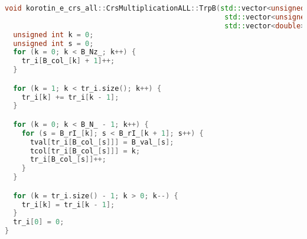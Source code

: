 \documentclass[a4paper,12pt]{article}
\begin{document}
\begin{lstlisting}[language=C++]
void korotin_e_crs_all::CrsMultiplicationALL::TrpB(std::vector<unsigned int> &tr_i,
                                                    std::vector<unsigned int> &tcol,
                                                    std::vector<double> &tval) {
  unsigned int k = 0;
  unsigned int s = 0;
  for (k = 0; k < B_Nz_; k++) {
    tr_i[B_col_[k] + 1]++;
  }

  for (k = 1; k < tr_i.size(); k++) {
    tr_i[k] += tr_i[k - 1];
  }

  for (k = 0; k < B_N_ - 1; k++) {
    for (s = B_rI_[k]; s < B_rI_[k + 1]; s++) {
      tval[tr_i[B_col_[s]]] = B_val_[s];
      tcol[tr_i[B_col_[s]]] = k;
      tr_i[B_col_[s]]++;
    }
  }

  for (k = tr_i.size() - 1; k > 0; k--) {
    tr_i[k] = tr_i[k - 1];
  }
  tr_i[0] = 0;
}
\end{lstlisting}
\end{document}
